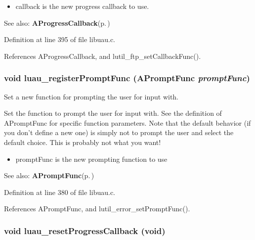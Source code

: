 \begin{itemize}
\item callback is the new progress callback to use.\end{itemize}
\begin{Desc}
\item[See also:]{\bf AProgress\-Callback}{\rm (p.\,\pageref{libuau_8h_a22})} \end{Desc}


Definition at line 395 of file libuau.c.

References AProgress\-Callback, and lutil\_\-ftp\_\-set\-Callback\-Func().
\subsubsection{\setlength{\rightskip}{0pt plus 5cm}void luau\_\-register\-Prompt\-Func ({\bf APrompt\-Func} {\em prompt\-Func})}\label{libuau_8c_a13}


Set a new function for prompting the user for input with. 

Set the function to prompt the user for input with. See the definition of APrompt\-Func for specific function parameters. Note that the default behavior (if you don't define a new one) is simply not to prompt the user and select the default choice. This is probably not what you want!

\begin{itemize}
\item prompt\-Func is the new prompting function to use\end{itemize}
\begin{Desc}
\item[See also:]{\bf APrompt\-Func}{\rm (p.\,\pageref{libuau_8h_a18})} \end{Desc}


Definition at line 380 of file libuau.c.

References APrompt\-Func, and lutil\_\-error\_\-set\-Prompt\-Func().
\subsubsection{\setlength{\rightskip}{0pt plus 5cm}void luau\_\-reset\-Progress\-Callback (void)}\label{libuau_8c_a16}


